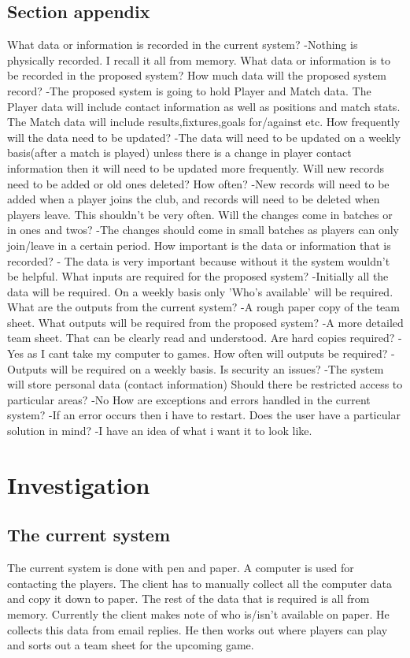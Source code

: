 \subsection{Section appendix}
What data or information is recorded in the current system?
-Nothing is physically recorded. I recall it all from memory.
What data or information is to be recorded in the proposed system? How much data will the proposed system record?
-The proposed system is going to hold Player and Match data. The Player data will include contact information as well as positions and match stats. The Match data will include results,fixtures,goals for/against etc.
How frequently will the data need to be updated?
-The data will need to be updated on a weekly basis(after a match is played) unless there is a change in player contact information then it will need to be updated more frequently. 
Will new records need to be added or old ones deleted? How often?
-New records will need to be added when a player joins the club, and records will need to be deleted when players leave. This shouldn't be very often.
Will the changes come in batches or in ones and twos?
-The changes should come in small batches as players can only join/leave in a certain period.
How important is the data or information that is recorded?
- The data is very important because without it the system wouldn't be helpful. 
What inputs are required for the proposed system?
-Initially all the data will be required. On a weekly basis only 'Who's available' will be required.
What are the outputs from the current system?
-A rough paper copy of the team sheet. 
What outputs will be required from the proposed system?
-A more detailed team sheet. That can be clearly read and understood.
Are hard copies required?
-Yes as I cant take my computer to games. 
How often will outputs be required?
-Outputs will be required on a weekly basis.
Is security an issues?
-The system will store personal data (contact information)
Should there be restricted access to particular areas?
-No
How are exceptions and errors handled in the current system?
-If an error occurs then i have to restart. 
Does the user have a particular solution in mind?
-I have an idea of what i want it to look like. 
\section{Investigation}

\subsection{The current system}
The current system is done with pen and paper. A computer is used for contacting the players. The client has to manually collect all the computer data and copy it down to paper. The rest of the data that is required is all from memory. Currently the client makes note of who is/isn't available on paper. He collects this data from email replies.  He then works out where players can play and sorts out a team sheet for the upcoming game.


